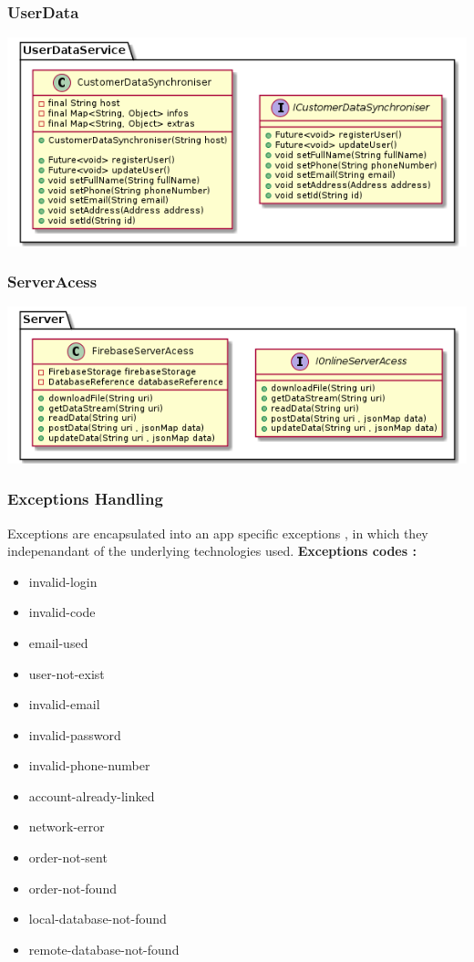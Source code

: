 \documentclass{article}
\begin{document}
 
\subsubsection{UserData}
\includegraphics[scale=0.5]{./out/MobileApp/Infrastructure/UserData/UserData.png}\\


\subsubsection{ServerAcess}
\includegraphics[scale=0.5]{./out/MobileApp/Infrastructure/ServerAcess/ServerAccess.png}\\

\subsubsection{Exceptions Handling}
Exceptions are encapsulated into an app specific exceptions , in which they indepenandant of the underlying technologies used.\newline
\textbf{Exceptions codes :}
\begin{itemize}
\item invalid-login
\item invalid-code
\item email-used
\item user-not-exist
\item invalid-email
\item invalid-password
\item invalid-phone-number
\item account-already-linked
\item network-error
\item order-not-sent
\item order-not-found
\item local-database-not-found
\item remote-database-not-found
\end{itemize}
\end{document}
